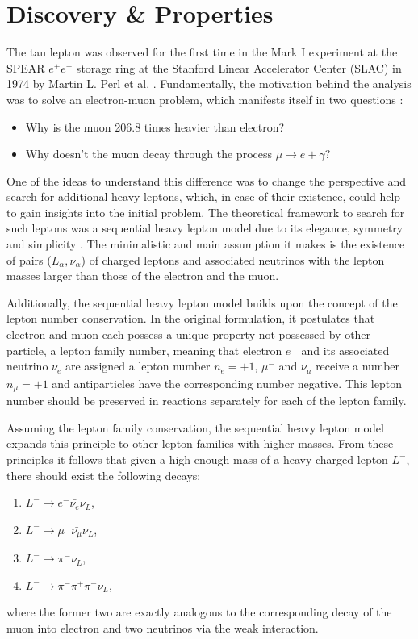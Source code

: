 \section{Discovery \& Properties} \label{tau-intro}

The tau lepton was observed for the first time in the Mark I experiment at the SPEAR $e^+e^-$ storage ring at the Stanford Linear Accelerator Center (SLAC) in 1974 by Martin L. Perl et al. \cite{Perl:1975bf}. Fundamentally, the motivation \cite{Perl:1992ad} behind the analysis was to solve  an electron-muon problem, which manifests itself in two questions \cite{Perl:1996dk}:
\begin{itemize}
    \item Why is the muon 206.8 times heavier than electron?
    \item Why doesn't the muon decay through the process $\mu \to e + \gamma$?
\end{itemize}

One of the ideas to understand this difference was to change the perspective and search for additional heavy leptons, which, in case of their existence, could help to gain insights into the initial problem. The theoretical framework to search for such leptons was a sequential heavy lepton model due to its elegance, symmetry and simplicity \cite{Perl:past_future}. The minimalistic and main assumption it makes is the existence of pairs ($L_\alpha, \nu_\alpha$) of charged leptons and associated neutrinos with the lepton masses larger than those of the electron and the muon. 

Additionally, the sequential heavy lepton model builds upon the concept of the lepton number conservation. In the original formulation, it postulates that electron and muon each possess a unique property not possessed by other particle, a lepton family number, meaning that electron $e^-$ and its associated neutrino $\nu_e$ are assigned a lepton number $n_e = +1$, $\mu^-$ and $\nu_\mu$ receive a number $n_\mu = +1$ and antiparticles have the corresponding number negative. This lepton number should be preserved in reactions separately for each of the lepton family.

Assuming the lepton family conservation, the sequential heavy lepton model expands this principle to other lepton families with higher masses.  From these principles it follows that given a high enough mass of a heavy charged lepton $L^-$, there should exist the following decays:
\begin{enumerate}[label=D\arabic*]
    \item \label{Ltoe} $L^- \to e^- \bar{\nu_e} \nu_L $, 
    \item \label{Ltomu} $L^- \to \mu^- \bar{\nu_\mu} \nu_L $,
    \item $L^- \to \pi^- \nu_L $,
    \item $L^- \to \pi^-\pi^+\pi^- \nu_L $,
\end{enumerate}
where the former two are exactly analogous to the corresponding decay of the muon into electron and two neutrinos via the weak interaction.

